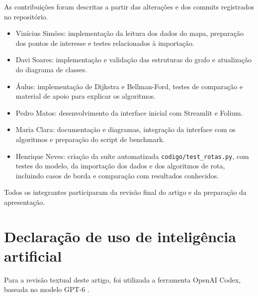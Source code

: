 \documentclass[12pt]{article}
\begin{document}
As contribuições foram descritas a partir das alterações e dos commits
registrados no repositório.

\begin{itemize}
    \item Vinícius Simões: implementação da leitura dos dados do mapa,
    preparação dos pontos de interesse e testes relacionados à importação.
    \item Davi Soares: implementação e validação das estruturas do grafo
    e atualização do diagrama de classes.
    \item Áulus: implementação de Dijkstra e Bellman-Ford, testes de
    comparação e material de apoio para explicar os algoritmos.
    \item Pedro Matos: desenvolvimento da interface inicial com
    Streamlit e Folium.
    \item Maria Clara: documentação e diagramas, integração da interface
    com os algoritmos e preparação do script de benchmark.
    \item Henrique Neves: criação da suíte automatizada
    \texttt{codigo/test\_rotas.py}, com testes do modelo, da importação
    dos dados e dos algoritmos de rota, incluindo casos de borda e
    comparação com resultados conhecidos.

\end{itemize}

Todos os integrantes participaram da revisão final do artigo e da
preparação da apresentação.




\section*{Declaração de uso de inteligência artificial}
Para a revisão textual deste artigo, foi utilizada a ferramenta
OpenAI Codex, baseada no modelo GPT-6 \cite{openaiCodex2026}.
\end{document}
